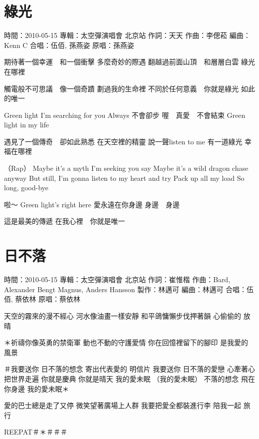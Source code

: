 \documentclass[UTF8,a4paper,oneside,twocolumn,12pt]{ctexbook}
\newcommand{\infopair}[2]{\textbullet #1：#2}
\newcommand{\zc}[1][伍佰]{\infopair{作詞}{#1}}
\newcommand{\zq}[1][伍佰]{\infopair{作曲}{#1}}
\newcommand{\bq}[1][伍佰]{\infopair{編曲}{#1}}
\newcommand{\zj}[1]{\infopair{專輯}{#1}}
\newcommand{\zz}[1]{\infopair{製作}{#1}}
\newcommand{\yc}[1]{\infopair{原唱}{#1}}
\newcommand{\sj}[1]{\infopair{時間}{#1}}
\newenvironment{info}{\begin{flushleft}\kaishu
	}
	{\end{flushleft}\normalsize\yahei\par}
\newenvironment{lyric}{
	}
{}
\begin{document}
\section{綠光}
\begin{info}
	\sj{2010-05-15}
	\zj{太空彈演唱會 北京站}
	\zc[天天]
	\zq[李偲菘]
	\bq[Kenn C]
	\infopair{合唱}{伍佰, 孫燕姿}
	\yc{孫燕姿}
\end{info}
\begin{lyric}
	期待著一個幸運　和一個衝擊
	多麼奇妙的際遇
	翻越過前面山頂　和層層白雲
	綠光在哪裡

	觸電般不可思議　像一個奇蹟
	劃過我的生命裡
	不同於任何意義　你就是綠光
	如此的唯一

	Green light   I'm searching for you
	Always   不會卻步
	喔　真愛　不會結束
	Green light in my life

	遇見了一個傳奇　卻如此熟悉
	在天空裡的精靈
	說一聲listen to me 有一道綠光
	幸福在哪裡

	（Rap）
	Maybe it's a myth I'm seeking you say
	Maybe it's a wild dragon chase anyway
	But still, I'm gonna listen to my heart and try
	Pack up all my load
	So long, good-bye

	啦～
	Green light's right here
	愛永遠在你身邊
	身邊　身邊

	這是最美的傳遞
	在我心裡　你就是唯一
\end{lyric}

\section{日不落}
\begin{info}
	\sj{2010-05-15}
	\zj{太空彈演唱會 北京站}
	\zc[崔惟楷]
	\zq[Bard, Alexander Bengt Magnus, Anders Hansson]
	\zz{林邁可}
	\bq[林邁可]
	\infopair{合唱}{伍佰, 蔡依林}
	\yc{蔡依林}
\end{info}
\begin{lyric}
	天空的霧來的漫不經心
	河水像油畫一樣安靜
	和平鴿慵懶步伐押著韻
	心偷偷的 放晴

	＊祈禱你像英勇的禁衛軍
	動也不動的守護愛情
	你在回憶裡留下的腳印
	是我愛的 風景

	＃我要送你 日不落的想念
	寄出代表愛的 明信片
	我要送你 日不落的愛戀
	心牽著心 把世界走遍
	你就是慶典 你就是晴天 我的愛未眠 （我的愛未眠）
	不落的想念 飛在你身邊 我的愛未眠＊

	愛的巴士總是走了又停
	微笑望著廣場上人群
	我要把愛全都裝進行李
	陪我一起 旅行

	REEPAT＃＊＃＃＃
\end{lyric}
\end{document}
